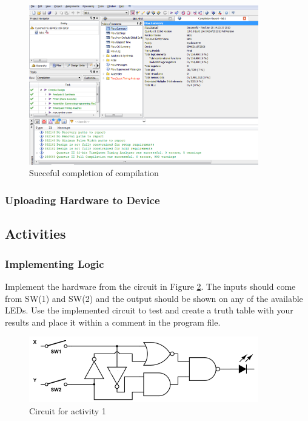 \begin{figure}[H]
	\centering
	\includegraphics[width=100mm]{Lab1/figures/compileresults.png}
	\caption{Succeful completion of compilation}
	\label{fig:compileresuts}
\end{figure}


\subsubsection{Uploading Hardware to Device}



\subsection{Activities}

\subsubsection{Implementing Logic}

Implement the hardware from the circuit in Figure \ref{fig:circuit1}. The inputs should come from SW(1) and SW(2) and the output should be shown on any of the available LEDs. Use the implemented circuit to test and create a truth table with your results and place it within a comment in the program file.

\begin{figure}[H]
	\centering
	\includegraphics[width=100mm]{Lab1/figures/circuit1.png}
	\caption{Circuit for activity 1}
	\label{fig:circuit1}
\end{figure}

